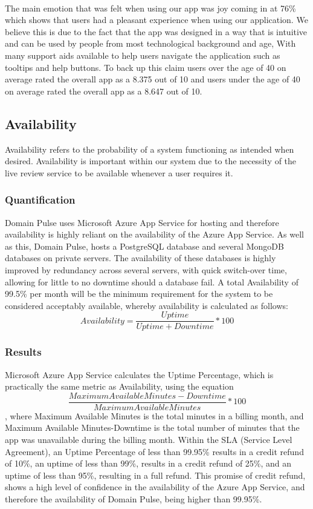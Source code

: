 \documentclass[12pt]{article}
\begin{document}
\\
The main emotion that was felt when using our app was joy coming in at 76\% which shows that users had a pleasant experience when using our application. We believe this is due to the fact that the app was designed in a way that is intuitive and can be used by people from most technological background and age, With many support aids available to help users navigate the application such as tooltips and help buttons.
To back up this claim users over the age of 40 on average rated the overall app as a 8.375 out of 10 and users under the age of 40 on average rated the overall app as a 8.647 out of 10.
\\



\newpage
\subsection{Availability}
Availability refers to the probability of a system functioning as intended when desired. Availability is important within our system due to the
necessity of the live review service to be available whenever a user requires it.
\subsubsection{Quantification}
Domain Pulse uses Microsoft Azure App Service for hosting and therefore availability is highly reliant on the availability of the Azure App Service.
As well as this, Domain Pulse, hosts a PostgreSQL database and several MongoDB databases on private servers. The availability of these databases
is highly improved by redundancy across several servers, with quick switch-over time, allowing for little to no downtime should a database fail.
A total Availability of 99.5\% per month will be the minimum requirement for the system to be considered acceptably available, whereby
availability is calculated as follows:
\begin{equation}
    Availability = \frac{Uptime}{Uptime + Downtime} * 100
\end{equation}

\subsubsection{Results}
Microsoft Azure App Service calculates the Uptime Percentage, which is practically the same metric as Availability, using the equation
\begin{equation}
    \frac{Maximum Available Minutes-Downtime}{Maximum Available Minutes} * 100
\end{equation}
, where Maximum Available Minutes is the total minutes in a billing month, and Maximum Available Minutes-Downtime is the total number of minutes that the app was unavailable during the billing month.
Within the SLA (Service Level Agreement), an Uptime Percentage of less than 99.95\% results in a credit refund of 10\%, an uptime of less than 99\%, results in a credit refund of 25\%, and an uptime of less than 95\%, resulting in a full refund.
This promise of credit refund, shows a high level of confidence in the availability of the Azure App Service, and therefore the availability of Domain Pulse, being higher than 99.95\%.
\end{document}
